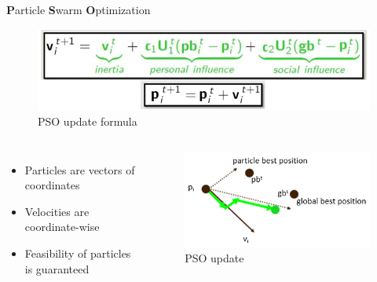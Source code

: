 \documentclass{beamer}
\begin{document}
	\begin{frame}{\textbf{P}article \textbf{S}warm \textbf{O}ptimization}
		\begin{figure}[htp]
			\centering
			\includegraphics[width=\textwidth]{images/dpso_formula_vertical.png}
			\caption{PSO update formula}
		\end{figure}
	
		\begin{columns}
				\begin{itemize}
					\item Particles are vectors of coordinates
					\item Velocities are coordinate-wise
					\item Feasibility of particles is guaranteed
				\end{itemize}
				\begin{figure}[htp]
					\centering
					\includegraphics[width=\textwidth]{images/dpso_update.png}
					\caption{PSO update}
				\end{figure}
		\end{columns}
	\end{frame}
\end{document}
